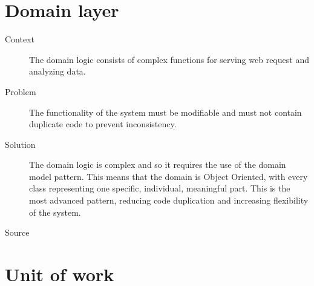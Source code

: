 \section{Domain layer}

\begin{description}
\item [Context]
The domain logic consists of complex functions for serving web request and analyzing data.

\item [Problem]
The functionality of the system must be modifiable and must not contain duplicate code to prevent inconsistency.

\item [Solution]
The domain logic is complex and so it requires the use of the domain model pattern. This means that the domain is Object Oriented, with every class representing one specific, individual, meaningful part.
This is the most advanced pattern, reducing code duplication and increasing flexibility of the system.

%

\item [Source]

\end{description}

\section{Unit of work}

